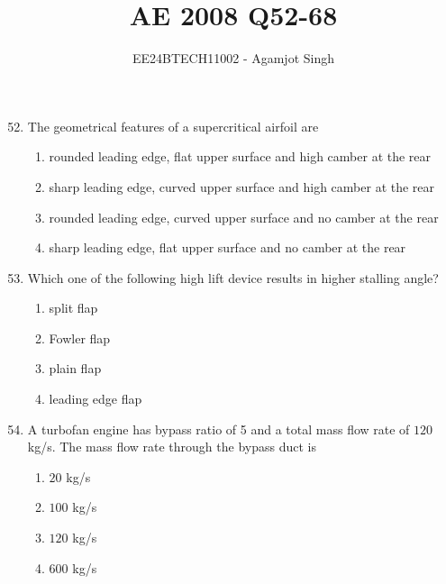 \documentclass[journal,onecolumn]{IEEEtran}
\theoremstyle{remark}
\begin{document}

\vspace{3cm}

\title{AE 2008 Q52-68}
\author{EE24BTECH11002 - Agamjot Singh}
\maketitle

\renewcommand{\thefigure}{\theenumi}
\renewcommand{\thetable}{\theenumi}

\begin{enumerate}
    \setcounter{enumi}{51}

    \item The geometrical features of a supercritical airfoil are

	\begin{enumerate}
		\item rounded leading edge, flat upper surface and high camber at the rear
		\item sharp leading edge, curved upper surface and high camber at the rear
		\item rounded leading edge, curved upper surface and no camber at the rear
		\item sharp leading edge, flat upper surface and no camber at the rear
	\end{enumerate}

    \item Which one of the following high lift device results in higher stalling angle?

	\begin{enumerate}
		\item split flap
		\item Fowler flap
		\item plain flap
		\item leading edge flap
	\end{enumerate}

    \item A turbofan engine has bypass ratio of 5 and a total mass flow rate of $120$ kg/s. The mass flow rate through the bypass duct is

	\begin{enumerate}
		\item $20$ kg/s
		\item $100$ kg/s
		\item $120$ kg/s
		\item $600$ kg/s
	\end{enumerate}



\end{enumerate}
\end{document}
